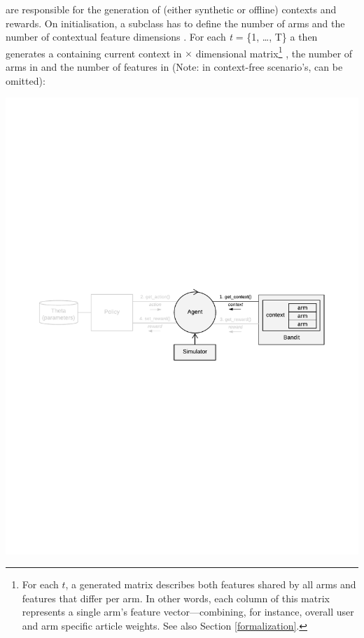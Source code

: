 \documentclass{jss}
\begin{document}
 are responsible for the generation of (either synthetic or offline) contexts and rewards. On initialisation, a  subclass has to define the number of arms  and the number of contextual feature dimensions . For each \emph{t} = \{1, \ldots, T\} a  then generates a  containing current context in  $\times$  dimensional matrix\footnote{For each $t$, a  generated matrix describes both features shared by all arms and features that differ per arm. In other words, each column of this matrix represents a single arm's feature vector---combining, for instance, overall user and arm specific article weights. See also Section \ref{formalization}.} , the number of arms in  and the number of features in  (Note: in context-free scenario's,  can be omitted):

\includegraphics[width=\textwidth]{fig/all_cmab_phases_Part3}
\end{document}
